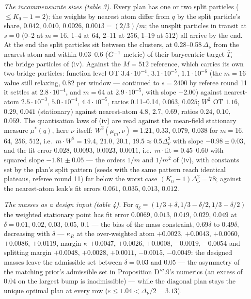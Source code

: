 \smallskip
\noindent\emph{The incommensurate sizes (table 3).} Every plan has one or two split particles
($\le K_0 - 1 = 2$); the weights by nearest atom differ from $q$ by the split particle's share, $0.042$, $0.010$,
$0.0026$, $0.0013 = (2/3)/m$; the unsplit particles in transit at $s = 0$ (0--2 at $m = 16$, 1--4 at $64$, 2--11
at $256$, 1--19 at $512$) all arrive by the end. At the end the split particles sit between the clusters, at
0.28--0.58\,$\Delta_\nu$ from the nearest atom and within 0.03--0.6 ($G^{-1}$ metric) of their barycentric target
$\bar T_i$ --- the bridge particles of (iv). Against the $M = 512$ reference, which carries its own two bridge
particles: function level OT $3.4\cdot10^{-4}$, $3.1\cdot10^{-5}$, $1.1\cdot10^{-6}$ (the $m = 16$ value still
relaxing, $0.82$ per window --- continued to $s = 2400$ by referee round 11 it settles at $2.8\cdot10^{-4}$, and
$m = 64$ at $2.9\cdot10^{-5}$, with slope $-2.00$) against nearest-atom $2.5\cdot10^{-3}$, $5.0\cdot10^{-4}$,
$4.4\cdot10^{-5}$, ratios 0.11--0.14, $0.063$, $0.025$; $W^2$ OT $1.16$, $0.29$, $0.041$ (stationary) against
nearest-atom $4.8$, $2.7$, $0.69$, ratios $0.24$, $0.10$, $0.059$. The quantisation laws of (iv) are read against
the mean-field stationary measure $\mu^*(q)$, here $\nu$ itself: $W^2(\mu_m,\nu) = 1.21$, $0.33$, $0.079$, $0.038$
for $m = 16$, $64$, $256$, $512$, i.e.\ $m\cdot W^2 = 19.4$, $21.0$, $20.1$, $19.5\approx0.5\Delta_\nu^2$ with slope
$-0.98\pm0.03$, and the fit error $0.028$, $0.0093$, $0.0023$, $0.0011$, i.e.\
$m\cdot\mathrm{fit} = 0.45$--$0.60$ with squared slope $-1.81\pm0.05$ --- the orders $1/m$ and $1/m^2$ of (iv),
with constants set by the plan's split pattern (seeds with the same pattern reach identical plateaus, referee round
11) far below the worst case $(K_0 - 1)\Delta_\nu^2 = 78$; against the nearest-atom leak's fit errors $0.061$,
$0.035$, $0.013$, $0.012$.

\smallskip
\noindent\emph{The masses as a design input (table 4).} For
$q_\delta = (1/3 + \delta,1/3 - \delta/2,1/3 - \delta/2)$ the weighted stationary point has fit error $0.0069$,
$0.013$, $0.019$, $0.029$, $0.049$ at $\delta = 0.01$, $0.02$, $0.03$, $0.05$, $0.1$ --- the bias of the mass
constraint, $0.69\delta$ to $0.49\delta$, decreasing with $\delta$ --- $\kappa_R$ at the over-weighted atom
$+0.0023$, $+0.0043$, $+0.0060$, $+0.0086$, $+0.0119$, margin $\kappa$ $+0.0047$, $+0.0026$, $+0.0008$, $-0.0019$,
$-0.0054$ and splitting margin $+0.0048$, $+0.0028$, $+0.0011$, $-0.0015$, $-0.0049$: the designed masses leave the
admissible set between $\delta = 0.03$ and $0.05$ --- the asymmetry of the matching prior's admissible set in
Proposition D$'''$.9's numerics (an excess of $0.04$ on the largest bump is inadmissible) --- while the diagonal plan
stays the unique optimal plan at every row ($\varepsilon\le1.04 < \Delta_\nu/2 = 3.13$).

